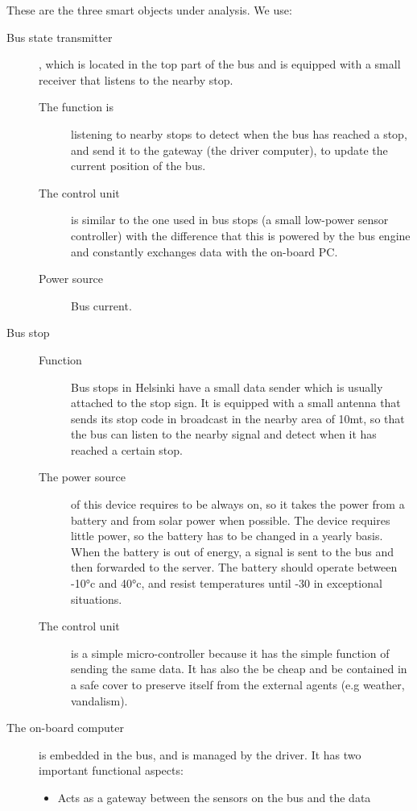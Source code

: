 \documentclass[a4paper, 12pt]{article}
\begin{document}
These are the three smart objects under analysis. We use:
\begin{description}
	\item[Bus state transmitter], which is located in the top part of the bus 
		and is equipped with a small receiver that listens to the nearby stop.
		\begin{description}
			\item[The function is] listening to nearby stops to detect when the
				bus has reached a stop, and send it to the gateway 
				(the driver computer), to update the current position of 
				the bus. 
			\item[The control unit] is similar to the one used in bus stops (a
				small low-power sensor controller) with the
				difference that this is powered by the bus engine and constantly
				exchanges data with the on-board PC.
			\item[Power source] Bus current.
		\end{description}
    \item[Bus stop]
		\begin{description}
		    \item[Function] Bus stops in Helsinki have a small data sender which is
		usually attached to the stop sign. It is equipped with a small antenna
		that sends its stop code in broadcast in the nearby area of 10mt, so that 
		the bus can listen to the nearby signal and detect when it has reached
		a certain stop. 
			\item[The power source] of this device requires to be always on, so it 
			takes the power from a battery and from solar power when possible.
			The device requires little power, so the battery has to be changed in
			a yearly basis. When the battery is out of energy, a signal is
			sent to the bus and then forwarded to the server. The battery
			should operate between -10°c and 40°c, and resist temperatures until
			-30 in exceptional situations.
			\item[The control unit] is a simple micro-controller because it has
				the simple function of sending the same data. It has also the
				be cheap and be contained in a safe cover to preserve itself
				from the external agents (e.g weather, vandalism).
		\end{description}
	\item[The on-board computer] is embedded in the bus, and is managed by the
		driver. It has two important functional aspects:
		\begin{itemize}
			\item Acts as a gateway between the sensors on the bus and the data

\end{itemize}
\end{description}
\end{document}
